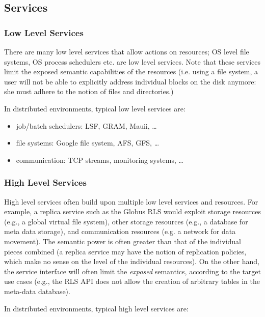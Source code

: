\documentclass[conference,final]{IEEEtran}
\newcommand{\I}[1]{\textit{#1}}
\begin{document}
 \subsection{Services}

  \subsubsection*{Low Level Services}  
 
   There are many low level services that allow actions on resources;
   OS level file systems, OS process schedulers etc. are low level
   services.  Note that these services limit the exposed semantic
   capabilities of the resources (i.e. using a file system, a user
   will not be able to explicitly address individual blocks on the
   disk anymore: she must adhere to the notion of files and
   directories.)
 
   In distributed environments, typical low level services are:

   \begin{itemize}
     \item job/batch schedulers: LSF, GRAM, Mauii, \dots
     \item file systems: Google file system, AFS, GFS, \dots
     \item communication: TCP streams, monitoring systems, \dots
   \end{itemize}
  \subsubsection*{High Level Services} 
  
   High level services often build upon multiple low level services
   and resources.  For example, a replica service such as the Globus
   RLS would exploit storage resources (e.g., a global virtual file
   system), other storage resources (e.g., a database for meta data
   storage), and communication resources (e.g. a network for data
   movement).  The semantic power is often greater than that of the
   individual pieces combined (a replica service may have the notion
   of replication policies, which make no sense on the level of the
   individual resources).  On the other hand, the service interface
   will often limit the \I{exposed} semantics, according to the target
   use cases (e.g., the RLS API does not allow the creation of
   arbitrary tables in the meta-data database).

   In distributed environments, typical high level services are:
\end{document}
